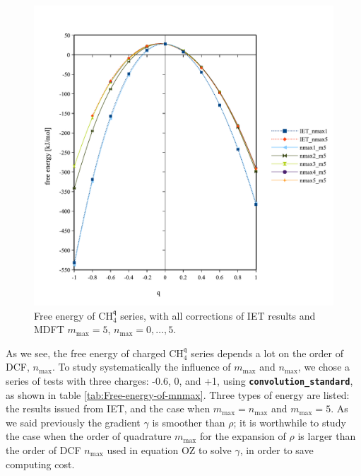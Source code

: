 \begin{figure}[!th]
\begin{centering}
\includegraphics[bb=0bp 20bp 510bp 490bp,width=0.9\columnwidth]{_figure/results/ch4_inter_nmax}
\par\end{centering}
\caption[Free energy of $\mathrm{C}\mathrm{H}_{4}^{\mathfrak{q}}$ series (with
corrections) for different $n_{\max}$ ($m_{\max}=5$)]{Free energy of $\mathrm{C}\mathrm{H}_{4}^{\mathfrak{q}}$ series,
with all corrections of \acs{IET} results and \acs{MDFT} $m_{\max}=5$,
$n_{\max}=0,\ldots,5$.\label{fig:Comparison-to-IET,with-corr-nmax}}
\end{figure}

As we see, the free energy of charged $\mathrm{C}\mathrm{H}_{4}^{\mathfrak{q}}$
series depends a lot on the order of \acs{DCF}, $n_{\max}$. To study
systematically the influence of $m_{\max}$ and $n_{\max}$, we chose
a series of tests with three charges: -0.6, 0, and +1, using \texttt{\textbf{convolution\_standard}},
as shown in table \ref{tab:Free-energy-of-mnmax}. Three types of
energy are listed: the results issued from \acs{IET}, and the case when
$m_{\max}=n_{\max}$ and $m_{\max}=5$. As we said previously the
gradient $\gamma$ is smoother than $\rho$; it is worthwhile to study
the case when the order of quadrature $m_{\max}$ for the expansion
of $\rho$ is larger than the order of \acs{DCF} $n_{\max}$ used
in equation \acs{OZ} to solve $\gamma$, in order to save computing
cost.

